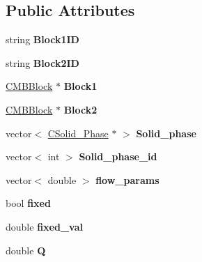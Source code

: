 \subsection*{Public Attributes}
\begin{DoxyCompactItemize}
\item 
\mbox{\label{class_c_connection_a043b0ea5027022efc435db952abe8a14}} 
string {\bfseries Block1\+ID}
\item 
\mbox{\label{class_c_connection_a68ed37fa0682b0df426e9f3dfffe5319}} 
string {\bfseries Block2\+ID}
\item 
\mbox{\label{class_c_connection_a7f534a66291d12b398f4508738eefb2d}} 
\hyperlink{class_c_m_b_block}{C\+M\+B\+Block} $\ast$ {\bfseries Block1}
\item 
\mbox{\label{class_c_connection_a9129e99b9465f0c4f4e7ce2e2c2dfcae}} 
\hyperlink{class_c_m_b_block}{C\+M\+B\+Block} $\ast$ {\bfseries Block2}
\item 
\mbox{\label{class_c_connection_afe0b5fc311be070eae9ab9bf11d236df}} 
vector$<$ \hyperlink{class_c_solid___phase}{C\+Solid\+\_\+\+Phase} $\ast$ $>$ {\bfseries Solid\+\_\+phase}
\item 
\mbox{\label{class_c_connection_a917cadb2a4e587a4bdfcd24ec3533ab8}} 
vector$<$ int $>$ {\bfseries Solid\+\_\+phase\+\_\+id}
\item 
\mbox{\label{class_c_connection_a90b54b1a6ffcf13755138d290591d47f}} 
vector$<$ double $>$ {\bfseries flow\+\_\+params}
\item 
\mbox{\label{class_c_connection_a4ac54e23c245f19042de41d155ff1137}} 
bool {\bfseries fixed}
\item 
\mbox{\label{class_c_connection_ad64bf85cec32975608f6098a43d709d8}} 
double {\bfseries fixed\+\_\+val}
\item 
\mbox{\label{class_c_connection_a27d8bec21b823cd7a11a0307f86cd19c}} 
double {\bfseries Q}
\item 

\end{DoxyCompactItemize}
